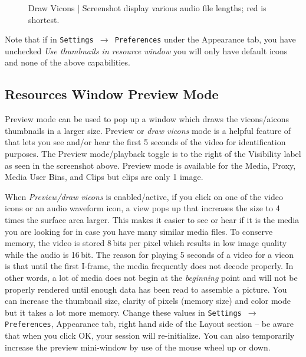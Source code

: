 \begin{figure}[htpb]
    \centering
    \caption{Draw Vicons   |            Screenshot display various audio file lengths; red is shortest.}
    \label{fig:vicons2}
\end{figure}

Note that if in \texttt{Settings $\rightarrow$ Preferences} under the Appearance tab, you have unchecked \textit{Use thumbnails in resource window} you will only have default icons and none of the above capabilities.


\subsection{Resources Window Preview Mode}%
\label{sub:resources_window_preview_mode}


Preview mode can be used to pop up a window which draws the vicons/aicons thumbnails in a larger size.  
Preview or \textit{draw vicons} mode is a helpful feature of \CGG{} that lets you see and/or hear the first 5 seconds of the video for identification purposes. 
The Preview mode/playback toggle is to the right of the Visibility label as seen in the screenshot above. 
Preview mode is available for the Media, Proxy, Media User Bins, and Clips but clips are only 1 image.

When \textit{Preview/draw vicons} is enabled/active, if you click on one of the video icons or an audio waveform icon, a view pops up that increases the size to 4 times the surface area larger. 
This makes it easier to see or hear if it is the media you are looking for in case you have many similar media files. 
To conserve memory, the video is stored 8\,bits per pixel which results in low image quality while the audio is 16\,bit. 
The reason for playing 5 seconds of a video for a vicon is that until the first I-frame, the media frequently does not decode properly.  
In other words, a lot of media does not begin at the \textit{beginning} point and will not be properly rendered until enough data has been read to assemble a picture.  
You can increase the thumbnail size, clarity of pixels (memory size) and color mode but it takes a lot more memory.  
Change these values in \texttt{Settings $\rightarrow$ Preferences}, Appearance tab, right hand side of the Layout section -- be aware that when you click OK, your session will re-initialize.  
You can also temporarily increase the preview mini-window by use of the mouse wheel up or down.

